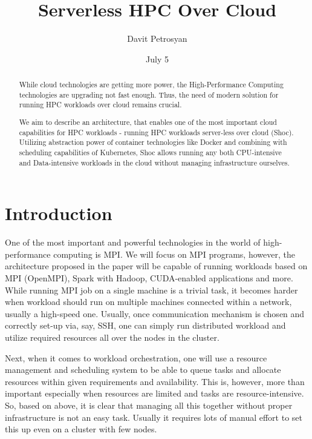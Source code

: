 \documentclass{article}
\title{Serverless HPC Over Cloud}
\author{Davit Petrosyan}
\date{July 5}
\begin{document}
\maketitle

\begin{abstract}
  While cloud technologies are getting more power, the High-Performance Computing technologies are upgrading not fast enough. Thus, the need of modern solution for running HPC workloads over cloud remains crucial. 
  
  We aim to describe an architecture, that enables one of the most important cloud capabilities for HPC workloads - running HPC workloads server-less over cloud (Shoc). Utilizing abstraction power of container technologies like Docker and combining with scheduling capabilities of Kubernetes, Shoc allows running any both CPU-intensive and Data-intensive workloads in the cloud without managing infrastructure ourselves. 
  
\end{abstract}

\section{Introduction}
One of the most important and powerful technologies in the world of high-performance computing is MPI. We will focus on MPI programs, however, the architecture proposed in the paper will be capable of running workloads based on MPI (OpenMPI), Spark with Hadoop, CUDA-enabled applications and more. 
While running MPI job on a single machine is a trivial task, it becomes harder when workload should run on multiple machines connected within a network, usually a high-speed one. Usually, once communication mechanism is chosen and correctly set-up via, say, SSH, one can simply run distributed workload and utilize required resources all over the nodes in the cluster.

Next, when it comes to workload orchestration, one will use a resource management and scheduling system to be able to queue tasks and allocate resources within given requirements and availability. This is, however, more than important especially when resources are limited and tasks are resource-intensive. So, based on above, it is clear that managing all this together without proper infrastructure is not an easy task. Usually it requires lots of manual effort to set this up even on a cluster with few nodes.  
\end{document}
